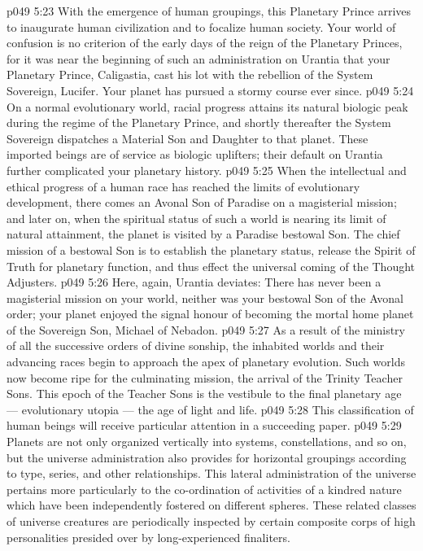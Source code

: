 \vs p049 5:23 With the emergence of human groupings, this Planetary Prince arrives to inaugurate human civilization and to focalize human society. Your world of confusion is no criterion of the early days of the reign of the Planetary Princes, for it was near the beginning of such an administration on Urantia that your Planetary Prince, Caligastia, cast his lot with the rebellion of the System Sovereign, Lucifer. Your planet has pursued a stormy course ever since.
\vs p049 5:24 On a normal evolutionary world, racial progress attains its natural biologic peak during the regime of the Planetary Prince, and shortly thereafter the System Sovereign dispatches a Material Son and Daughter to that planet. These imported beings are of service as biologic uplifters; their default on Urantia further complicated your planetary history.
\vs p049 5:25 When the intellectual and ethical progress of a human race has reached the limits of evolutionary development, there comes an Avonal Son of Paradise on a magisterial mission; and later on, when the spiritual status of such a world is nearing its limit of natural attainment, the planet is visited by a Paradise bestowal Son. The chief mission of a bestowal Son is to establish the planetary status, release the Spirit of Truth for planetary function, and thus effect the universal coming of the Thought Adjusters.
\vs p049 5:26 Here, again, Urantia deviates: There has never been a magisterial mission on your world, neither was your bestowal Son of the Avonal order; your planet enjoyed the signal honour of becoming the mortal home planet of the Sovereign Son, Michael of Nebadon.
\vs p049 5:27 As a result of the ministry of all the successive orders of divine sonship, the inhabited worlds and their advancing races begin to approach the apex of planetary evolution. Such worlds now become ripe for the culminating mission, the arrival of the Trinity Teacher Sons. This epoch of the Teacher Sons is the vestibule to the final planetary age --- evolutionary utopia --- the age of light and life.
\vs p049 5:28 This classification of human beings will receive particular attention in a succeeding paper.
\vs p049 5:29 \bibnobreakspace {} Planets are not only organized vertically into systems, constellations, and so on, but the universe administration also provides for horizontal groupings according to type, series, and other relationships. This lateral administration of the universe pertains more particularly to the co\hyp{}ordination of activities of a kindred nature which have been independently fostered on different spheres. These related classes of universe creatures are periodically inspected by certain composite corps of high personalities presided over by long\hyp{}experienced finaliters.
